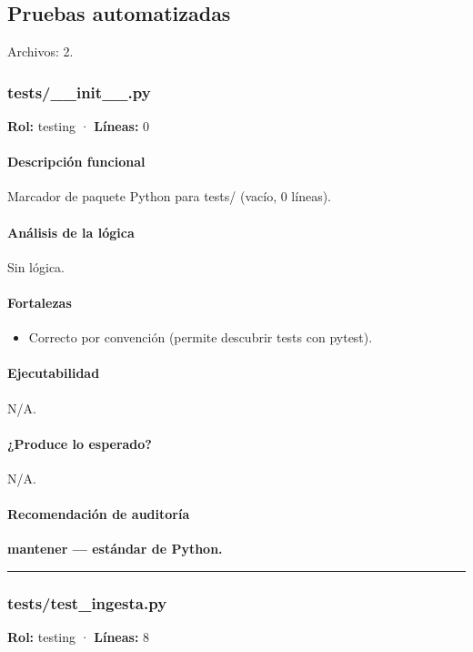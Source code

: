\subsection{Pruebas automatizadas}
\noindent Archivos: 2.

\subsubsection{tests/\_\_init\_\_.py}
\textbf{Rol:} testing · \textbf{Líneas:} 0

\paragraph{Descripción funcional}
Marcador de paquete Python para tests/ (vacío, 0 líneas).

\paragraph{Análisis de la lógica}
Sin lógica.

\paragraph{Fortalezas}
\begin{itemize}
  \item Correcto por convención (permite descubrir tests con pytest).
\end{itemize}

\paragraph{Ejecutabilidad}
N/A.

\paragraph{¿Produce lo esperado?}
N/A.

\paragraph{Recomendación de auditoría}
\textbf{mantener --- estándar de Python.}

\medskip
\hrule

\subsubsection{tests/test\_ingesta.py}
\textbf{Rol:} testing · \textbf{Líneas:} 8

